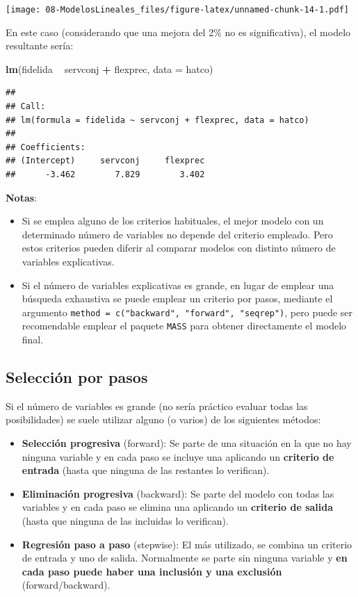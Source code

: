 \documentclass[]{book}
\newenvironment{Shaded}{\begin{snugshade}}{\end{snugshade}}
\newcommand{\KeywordTok}[1]{\textcolor[rgb]{0.13,0.29,0.53}{\textbf{#1}}}
\newcommand{\DataTypeTok}[1]{\textcolor[rgb]{0.13,0.29,0.53}{#1}}
\newcommand{\StringTok}[1]{\textcolor[rgb]{0.31,0.60,0.02}{#1}}
\newcommand{\OperatorTok}[1]{\textcolor[rgb]{0.81,0.36,0.00}{\textbf{#1}}}
\newcommand{\NormalTok}[1]{#1}
\begin{document}
\texttt{[image: 08-ModelosLineales\_files/figure-latex/unnamed-chunk-14-1.pdf]}

En este caso (considerando que una mejora del 2\% no es significativa),
el modelo resultante sería:

\begin{Shaded}
\begin{Highlighting}[]
\KeywordTok{lm}\NormalTok{(fidelida }\OperatorTok{~}\StringTok{ }\NormalTok{servconj }\OperatorTok{+}\StringTok{ }\NormalTok{flexprec, }\DataTypeTok{data =}\NormalTok{ hatco)}
\end{Highlighting}
\end{Shaded}

\begin{verbatim}
## 
## Call:
## lm(formula = fidelida ~ servconj + flexprec, data = hatco)
## 
## Coefficients:
## (Intercept)     servconj     flexprec  
##      -3.462        7.829        3.402
\end{verbatim}

\textbf{Notas}:

\begin{itemize}
\item
  Si se emplea alguno de los criterios habituales, el mejor modelo con
  un determinado número de variables no depende del criterio empleado.
  Pero estos criterios pueden diferir al comparar modelos con distinto
  número de variables explicativas.
\item
  Si el número de variables explicativas es grande, en lugar de emplear
  una búsqueda exhaustiva se puede emplear un criterio por pasos,
  mediante el argumento
  \texttt{method\ =\ c("backward",\ "forward",\ "seqrep")}, pero puede
  ser recomendable emplear el paquete \texttt{MASS} para obtener
  directamente el modelo final.
\end{itemize}

\subsection{Selección por pasos}\label{seleccion-por-pasos}

Si el número de variables es grande (no sería práctico evaluar todas las
posibilidades) se suele utilizar alguno (o varios) de los siguientes
métodos:

\begin{itemize}
\item
  \textbf{Selección progresiva} (forward): Se parte de una situación en
  la que no hay ninguna variable y en cada paso se incluye una aplicando
  un \textbf{criterio de entrada} (hasta que ninguna de las restantes lo
  verifican).
\item
  \textbf{Eliminación progresiva} (backward): Se parte del modelo con
  todas las variables y en cada paso se elimina una aplicando un
  \textbf{criterio de salida} (hasta que ninguna de las incluidas lo
  verifican).
\item
  \textbf{Regresión paso a paso} (stepwise): El más utilizado, se
  combina un criterio de entrada y uno de salida. Normalmente se parte
  sin ninguna variable y \textbf{en cada paso puede haber una inclusión
  y una exclusión} (forward/backward).
\end{itemize}
\end{document}
